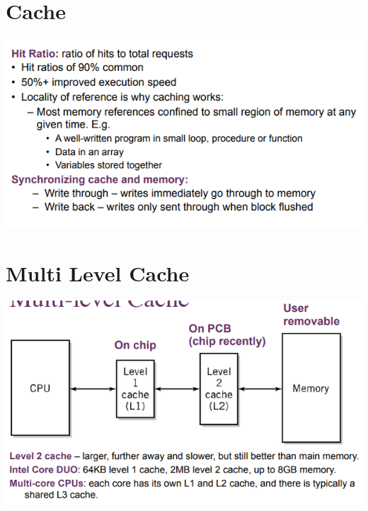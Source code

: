 \documentclass{article}[18pt]
\begin{document}
\section{Cache}
\begin{center}
	\includegraphics[scale=0.7]{cache1}
\end{center}
\section{Multi Level Cache}
\begin{center}
	\includegraphics[scale=0.7]{multi-level-cache}
\end{center}
\end{document}
